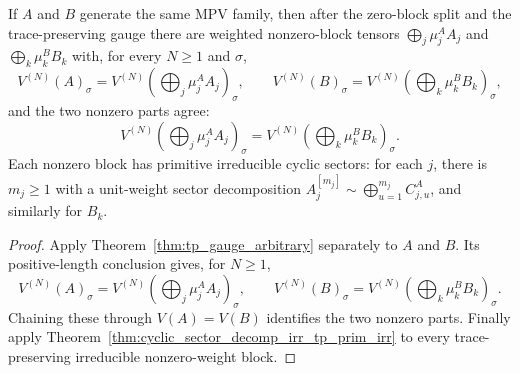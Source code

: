 \begin{theorem}%
    \label{thm:ft_after_blocking_per_block_cyclic_live_zero_tail}
    \leanok
    If $A$ and $B$ generate the same MPV family, then after the zero-block split
    and the trace-preserving gauge there are weighted nonzero-block tensors
    $\bigoplus_j \mu^A_j A_j$ and $\bigoplus_k \mu^B_k B_k$ with, for every
    $N\ge 1$ and $\sigma$,
    \[
        V^{(N)}(A)_\sigma
        =
        V^{(N)}\!(\textstyle\bigoplus_j \mu^A_j A_j)_\sigma,
        \qquad
        V^{(N)}(B)_\sigma
        =
        V^{(N)}\!(\textstyle\bigoplus_k \mu^B_k B_k)_\sigma,
    \]
    and the two nonzero parts agree:
    \[
        V^{(N)}\!(\textstyle\bigoplus_j \mu^A_j A_j)_\sigma
        =
        V^{(N)}\!(\textstyle\bigoplus_k \mu^B_k B_k)_\sigma.
    \]
    Each nonzero block has primitive irreducible cyclic sectors: for each $j$,
    there is $m_j\ge 1$ with a unit-weight sector decomposition
    $A_j^{[m_j]} \sim \bigoplus_{u=1}^{m_j} C^A_{j,u}$, and similarly for $B_k$.
\end{theorem}

\begin{proof}\leanok
    Apply Theorem~\ref{thm:tp_gauge_arbitrary} separately to $A$ and $B$. Its
    positive-length conclusion gives, for $N\ge 1$,
    \[
        V^{(N)}(A)_\sigma
        =
        V^{(N)}\!(\textstyle\bigoplus_j \mu^A_j A_j)_\sigma,
        \qquad
        V^{(N)}(B)_\sigma
        =
        V^{(N)}\!(\textstyle\bigoplus_k \mu^B_k B_k)_\sigma.
    \]
    Chaining these through $V(A)=V(B)$ identifies the two nonzero parts. Finally
    apply Theorem~\ref{thm:cyclic_sector_decomp_irr_tp_prim_irr} to
    every trace-preserving irreducible nonzero-weight block.
\end{proof}

